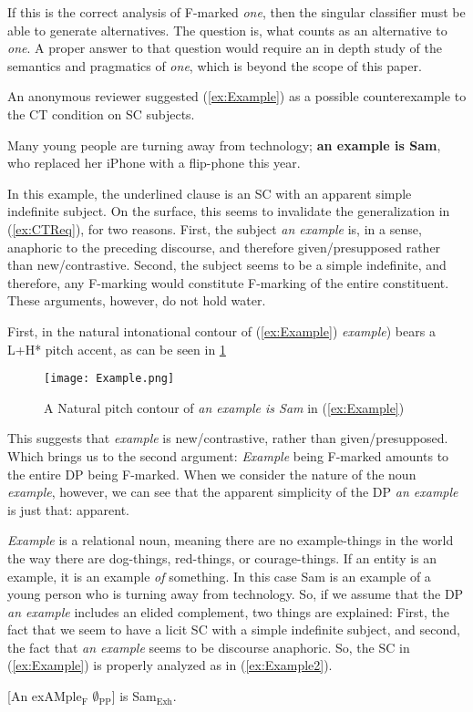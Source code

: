 \documentclass[
	letterpaper,
]{article}
\begin{document}
If this is the correct analysis of F-marked \textit{one}, then the singular classifier must be able to generate alternatives.
The question is, what counts as an alternative to \textit{one}.
A proper answer to that question would require an in depth study of the semantics and pragmatics of \textit{one}, which is beyond the scope of this paper.


An anonymous reviewer suggested (\ref{ex:Example}) as a possible counterexample to the CT condition on SC subjects.
\begin{exe}
	\ex\label{ex:Example} Many young people are turning away from technology; \textbf{an example is Sam}, who replaced her iPhone with a flip-phone this year.
\end{exe}
In this example, the underlined clause is an SC with an apparent simple indefinite subject.
On the surface, this seems to invalidate the generalization in (\ref{ex:CTReq}), for two reasons.
First, the subject \textit{an example} is, in a sense, anaphoric to the preceding discourse, and therefore given/presupposed rather than new/contrastive.
Second, the subject seems to be a simple indefinite, and therefore, any F-marking would constitute F-marking of the entire constituent.
These arguments, however, do not hold water.

First, in the natural intonational contour of (\ref{ex:Example}) \textit{example}) bears a L+H* pitch accent, as can be seen in \ref{fig:Example}
\begin{figure}[h]
	\centering
	\texttt{[image: Example.png]}
	\caption{A Natural pitch contour of \textit{an example is Sam} in (\ref{ex:Example})}
	\label{fig:Example}
\end{figure}
This suggests that \textit{example} is new/contrastive, rather than given/presupposed.
Which brings us to the second argument: \textit{Example} being F-marked amounts to the entire DP being F-marked.
When we consider the nature of the noun \textit{example}, however, we can see that the apparent simplicity of the DP \textit{an example} is just that: apparent.

\textit{Example} is a relational noun, meaning there are no example-things in the world the way there are dog-things, red-things, or courage-things.
If an entity is an example, it is an example \textit{of} something.
In this case Sam is an example of a young person who is turning away from technology.
So, if we assume that the DP \textit{an example} includes an elided complement, two things are explained:
First, the fact that we seem to have a licit SC with a simple indefinite subject, and second, the fact that \textit{an example} seems to be discourse anaphoric.
So, the SC in (\ref{ex:Example}) is properly analyzed as in (\ref{ex:Example2}).
\begin{exe}	
	\ex \label{ex:Example2} [An exAMple$_\text{F}$ $\emptyset_\text{PP}$] is Sam$_\text{Exh}$.
\end{exe}
\end{document}
